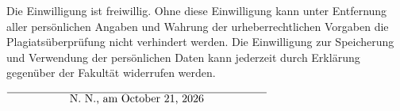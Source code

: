 \documentclass[12pt,twoside,a4paper,parskip]{scrbook}
\def\BaAuthor{Achim Winter}
\def\ShowBaAuthor{\BaAuthor}
\def\ShowBaAuthor{N.~N.}
\begin{document}
\begin{small}
Die Einwilligung ist freiwillig. Ohne diese Einwilligung kann unter Entfernung aller persönlichen Angaben und Wahrung der urheberrechtlichen Vorgaben die Plagiatsüberprüfung nicht verhindert werden. Die Einwilligung zur Speicherung und Verwendung der persönlichen Daten kann jederzeit durch Erklärung gegenüber der Fakultät widerrufen werden.
\end{small}

\vspace{20pt}
\begin{flushright}
$\overline{~~~~~~~~~~~~~~~~~\mbox{\ShowBaAuthor, am \today}~~~~~~~~~~~~~~~~~}$
\end{flushright}
\end{document}
